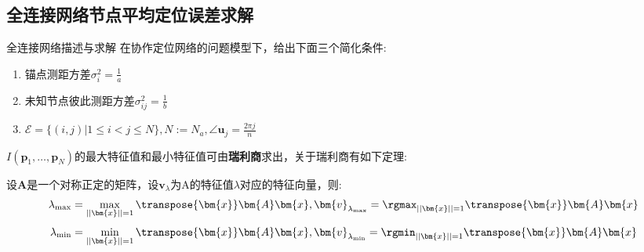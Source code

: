 \subsection{全连接网络节点平均定位误差求解}\label{subsection:complete_graph_cooperation}
{全连接网络描述与求解}
在协作定位网络的问题模型下，给出下面三个简化条件:
\begin{enumerate}
\item 锚点测距方差$\sigma_i^2=\frac{1}{a}$
\item 未知节点彼此测距方差$\sigma^2_{ij}=\frac{1}{b}$
\item $\mathcal{E}=\{(i,j)|1\leq i <j\leq N\},N:=N_a,\angle\bm{u}_j=\frac{2\pi j}{n}$
\end{enumerate}
$I(\bm{p}_1,\dots,\bm{p}_N)$的最大特征值和最小特征值可由\textbf{瑞利商}求出，关于瑞利商有如下定理:
\begin{theorem}\label{theorem:rayleigh}
  设$\bm{A}$是一个对称正定的矩阵，设$\bm{v}_{\lambda}$为A的特征值$\lambda$对应的特征向量，则:
\[
\displaystyle\lambda_{\text{max}}=\max_{||\bm{x}||=1} \transpose{\bm{x}}\bm{A}\bm{x},\bm{v}_{\lambda_{\text{max}}}=\rgmax_{||\bm{x}||=1} \transpose{\bm{x}}\bm{A}\bm{x}
\]\[
\displaystyle\lambda_{\text{min}}=\min_{||\bm{x}||=1} \transpose{\bm{x}}\bm{A}\bm{x},\bm{v}_{\lambda_{\text{min}}}=\rgmin_{||\bm{x}||=1} \transpose{\bm{x}}\bm{A}\bm{x}
\]
\end{theorem}


